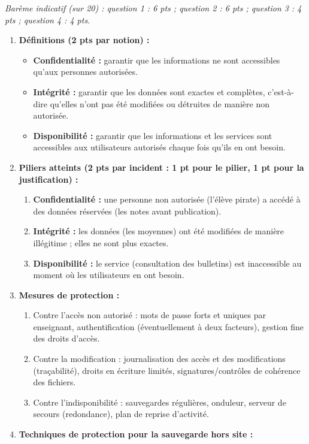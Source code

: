 \documentclass[11pt]{article}
\begin{document}
\begin{corrige}
\emph{Barème indicatif (sur 20) : question 1 : 6 pts ; question 2 : 6 pts ; question 3 : 4 pts ; question 4 : 4 pts.}
\begin{enumerate}
\item \textbf{Définitions (2 pts par notion) :}
\begin{itemize}
\item \textbf{Confidentialité :} garantir que les informations ne sont accessibles qu'aux personnes autorisées.
\item \textbf{Intégrité :} garantir que les données sont exactes et complètes, c'est-à-dire qu'elles n'ont pas été modifiées ou détruites de manière non autorisée.
\item \textbf{Disponibilité :} garantir que les informations et les services sont accessibles aux utilisateurs autorisés chaque fois qu'ils en ont besoin.
\end{itemize}
\item \textbf{Piliers atteints (2 pts par incident : 1 pt pour le pilier, 1 pt pour la justification) :}
\begin{enumerate}
\item \textbf{Confidentialité :} une personne non autorisée (l'élève pirate) a accédé à des données réservées (les notes avant publication).
\item \textbf{Intégrité :} les données (les moyennes) ont été modifiées de manière illégitime ; elles ne sont plus exactes.
\item \textbf{Disponibilité :} le service (consultation des bulletins) est inaccessible au moment où les utilisateurs en ont besoin.
\end{enumerate}
\item \textbf{Mesures de protection :}
\begin{enumerate}
\item Contre l'accès non autorisé : mots de passe forts et uniques par enseignant, authentification (éventuellement à deux facteurs), gestion fine des droits d'accès.
\item Contre la modification : journalisation des accès et des modifications (traçabilité), droits en écriture limités, signatures/contrôles de cohérence des fichiers.
\item Contre l'indisponibilité : sauvegardes régulières, onduleur, serveur de secours (redondance), plan de reprise d'activité.
\end{enumerate}
\item \textbf{Techniques de protection pour la sauvegarde hors site :}

\end{enumerate}
\end{corrige}
\end{document}
